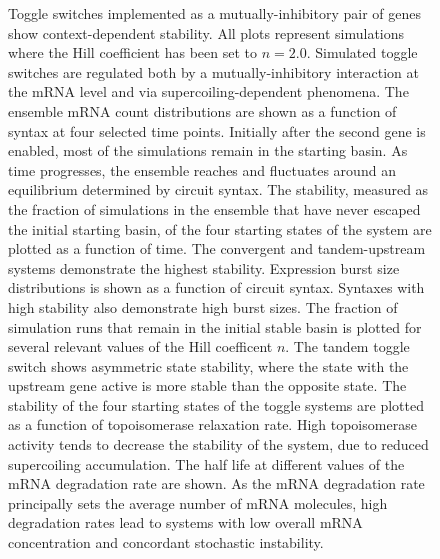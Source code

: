 \documentclass[11pt]{article}
\begin{document}
\begin{figure}[htbp]
    \ContinuedFloat
    \caption{Toggle switches implemented as a mutually-inhibitory pair of genes show context-dependent stability. All plots represent simulations where the Hill coefficient has been set to \(n = 2.0\).
     Simulated toggle switches are regulated both by a mutually-inhibitory interaction at the mRNA level and via supercoiling-dependent phenomena.
     The ensemble mRNA count distributions are shown as a function of syntax at four selected time points. Initially after the second gene is enabled, most of the simulations remain in the starting basin. As time progresses, the ensemble reaches and fluctuates around an equilibrium determined by circuit syntax.
     The stability, measured as the fraction of simulations in the ensemble that have never escaped the initial starting basin, of the four starting states of the system are plotted as a function of time. The convergent and tandem-upstream systems demonstrate the highest stability.
     Expression burst size distributions is shown as a function of circuit syntax. Syntaxes with high stability also demonstrate high burst sizes.
     The fraction of simulation runs that remain in the initial stable basin is plotted for several relevant values of the Hill coefficent \(n\). The tandem toggle switch shows asymmetric state stability, where the state with the upstream gene active is more stable than the opposite state.
     The stability of the four starting states of the toggle systems are plotted as a function of topoisomerase relaxation rate. High topoisomerase activity tends to decrease the stability of the system, due to reduced supercoiling accumulation.
     The half life at different values of the mRNA degradation rate are shown. As the mRNA degradation rate principally sets the average number of mRNA molecules, high degradation rates lead to systems with low overall mRNA concentration and concordant stochastic instability.
} \label{fig:top:toggle_switch}
\end{figure}


\FloatBarrier
\end{document}

